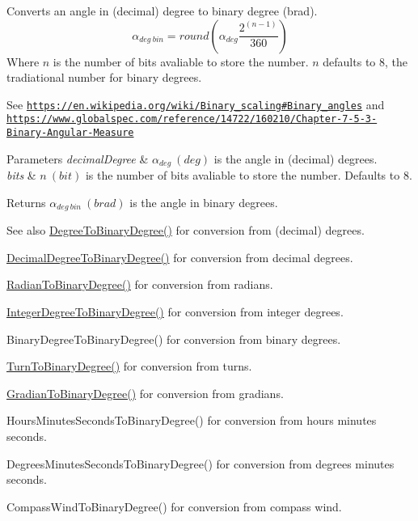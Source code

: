 Converts an angle in (decimal) degree to binary degree (brad). \[\alpha_{deg\ bin}=round(\alpha_{deg}\frac{2^{(n-1)}}{360})\] Where $n$ is the number of bits avaliable to store the number. $n$ defaults to 8, the tradiational number for binary degrees. 

See \href{https://en.wikipedia.org/wiki/Binary_scaling#Binary_angles}{\tt https\+://en.\+wikipedia.\+org/wiki/\+Binary\+\_\+scaling\#\+Binary\+\_\+angles} and \href{https://www.globalspec.com/reference/14722/160210/Chapter-7-5-3-Binary-Angular-Measure}{\tt https\+://www.\+globalspec.\+com/reference/14722/160210/\+Chapter-\/7-\/5-\/3-\/\+Binary-\/\+Angular-\/\+Measure} 
\begin{DoxyParams}{Parameters}
{\em decimal\+Degree} & $\alpha_{deg}\ (deg)$ is the angle in (decimal) degrees. \\
\hline
{\em bits} & $n\ (bit)$ is the number of bits avaliable to store the number. Defaults to 8. \\
\hline
\end{DoxyParams}
\begin{DoxyReturn}{Returns}
$\alpha_{deg\ bin}\ (brad)$ is the angle in binary degrees. 
\end{DoxyReturn}
\begin{DoxySeeAlso}{See also}
\mbox{\hyperlink{group___e_g_x_math-_angle_conversions-_degree_gacd1e3dc5194e89426a899a7cac4874f8}{Degree\+To\+Binary\+Degree()}} for conversion from (decimal) degrees. 

\mbox{\hyperlink{group___e_g_x_math-_angle_conversions-_decimal_degree_gaceec7ae7988c7f342d0b0fa6940720a1}{Decimal\+Degree\+To\+Binary\+Degree()}} for conversion from decimal degrees. 

\mbox{\hyperlink{group___e_g_x_math-_angle_conversions-_radian_ga13311d9b6977d514f1d6c336e7c0162b}{Radian\+To\+Binary\+Degree()}} for conversion from radians. 

\mbox{\hyperlink{group___e_g_x_math-_angle_conversions-_integer_degree_ga694bbfe624c3c14e97ce6155ca9bc44d}{Integer\+Degree\+To\+Binary\+Degree()}} for conversion from integer degrees. 

Binary\+Degree\+To\+Binary\+Degree() for conversion from binary degrees. 

\mbox{\hyperlink{group___e_g_x_math-_angle_conversions-_turn_ga678efb8f5c3958351fc3f1dfaf117b28}{Turn\+To\+Binary\+Degree()}} for conversion from turns. 

\mbox{\hyperlink{group___e_g_x_math-_angle_conversions-_gradian_ga6bf31920148bfd61f1f06eb961c3f62b}{Gradian\+To\+Binary\+Degree()}} for conversion from gradians. 

Hours\+Minutes\+Seconds\+To\+Binary\+Degree() for conversion from hours minutes seconds. 

Degrees\+Minutes\+Seconds\+To\+Binary\+Degree() for conversion from degrees minutes seconds. 

Compass\+Wind\+To\+Binary\+Degree() for conversion from compass wind. 
\end{DoxySeeAlso}
